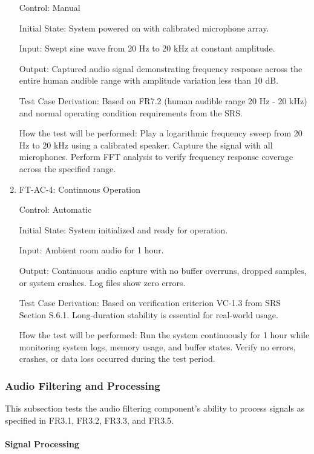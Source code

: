\documentclass[12pt, titlepage]{article}
\begin{document}
\begin{enumerate}
Control: Manual
					
Initial State: System powered on with calibrated microphone array.
					
Input: Swept sine wave from 20 Hz to 20 kHz at constant amplitude.
					
Output: Captured audio signal demonstrating frequency response across the entire
human audible range with amplitude variation less than 10 dB.

Test Case Derivation: Based on FR7.2 (human audible range 20 Hz - 20 kHz) and
normal operating condition requirements from the SRS.

How the test will be performed: Play a logarithmic frequency sweep from 20 Hz to 20
kHz using a calibrated speaker. Capture the signal with all microphones. Perform
FFT analysis to verify frequency response coverage across the specified range.

\item{FT-AC-4: Continuous Operation\\}

Control: Automatic
					
Initial State: System initialized and ready for operation.
					
Input: Ambient room audio for 1 hour.
					
Output: Continuous audio capture with no buffer overruns, dropped samples, or
system crashes. Log files show zero errors.

Test Case Derivation: Based on verification criterion VC-1.3 from SRS Section
S.6.1. Long-duration stability is essential for real-world usage.

How the test will be performed: Run the system continuously for 1 hour while
monitoring system logs, memory usage, and buffer states. Verify no errors,
crashes, or data loss occurred during the test period.

\end{enumerate}

\subsubsection{Audio Filtering and Processing}

This subsection tests the audio filtering component's ability to process signals
as specified in FR3.1, FR3.2, FR3.3, and FR3.5.

\paragraph{Signal Processing}
\end{document}
